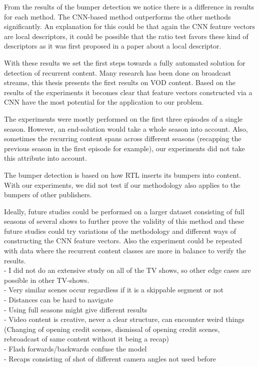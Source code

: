 \documentclass{article}
\begin{document}
From the results of the bumper detection we notice there is a difference in results for each method. The CNN-based method outperforms the other methods significantly. An explanation for this could be that again the CNN feature vectors are local descriptors, it could be possible that the ratio test favors these kind of descriptors as it was first proposed in a paper about a local descriptor.

With these results we set the first steps towards a fully automated solution for detection of recurrent content. Many research has been done on broadcast streams, this thesis presents the first results on VOD content. Based on the results of the experiments it becomes clear that feature vectors constructed via a CNN have the most potential for the application to our problem.

The experiments were mostly performed on the first three episodes of a single season. However, an end-solution would take a whole season into account. Also, sometimes the recurring content spans across different seasons (recapping the previous season in the first episode for example), our experiments did not take this attribute into account.

The bumper detection is based on how RTL inserts its bumpers into content. With our experiments, we did not test if our methodology also applies to the bumpers of other publishers.

Ideally, future studies could be performed on a larger dataset consisting of full seasons of several shows to further prove the validity of this method and these future studies could try variations of the methodology and different ways of constructing the CNN feature vectors. Also the experiment could be repeated with data where the recurrent content classes are more in balance to verify the results.
\\

\iffalse
- I did not do an extensive study on all of the TV shows, so other edge cases are possible in other TV-shows.\\
- Very similar scenes occur regardless if it is a skippable segment or not\\
- Distances can be hard to navigate\\
- Using full seasons might give different results\\
- Video content is creative, never a clear structure, can encounter weird things (Changing of opening credit scenes, dismissal of opening credit scenes, rebroadcast of same content without it being a recap)\\
- Flash forwards/backwards confuse the model\\
- Recaps consisting of shot of different camera angles not used before
\end{document}
